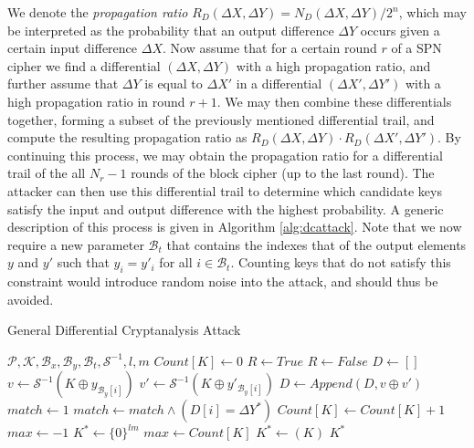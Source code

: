 We denote the \emph{propagation ratio} $R_D(\Delta X, \Delta Y) = N_D(\Delta X, \Delta Y) / 2^n$, which may be interpreted as the probability that an output difference $\Delta Y$ occurs given a certain input difference $\Delta X$. Now assume that for a certain round $r$ of a SPN cipher we find a differential $(\Delta X, \Delta Y)$ with a high propagation ratio, and further assume that $\Delta Y$ is equal to $\Delta X'$ in a differential $(\Delta X', \Delta Y')$ with a high propagation ratio in round $r + 1$. We may then combine these differentials together, forming a subset of the previously mentioned differential trail, and compute the resulting propagation ratio as $R_D(\Delta X, \Delta Y) \cdot R_D(\Delta X', \Delta Y')$. By continuing this process, we may obtain the propagation ratio for a differential trail of the all $N_r - 1$ rounds of the block cipher (up to the last round). The attacker can then use this differential trail to determine which candidate keys satisfy the input and output difference with the highest probability. A generic description of this process is given in Algorithm \ref{alg:dcattack}. Note that we now require a new parameter $\mathcal{B}_t$ that contains the indexes that of the output elements $y$ and $y'$ such that $y_i = y'_i$ for all $i \in \mathcal{B}_t$. Counting keys that do not satisfy this constraint would introduce random noise into the attack, and should thus be avoided.

\begin{algorithm}[t!] %
\caption{General Differential Cryptanalysis Attack} \label{alg:dcattack}
\begin{algorithmic}[1]
\Require $\mathcal{P}, \mathcal{K}, \mathcal{B}_x, \mathcal{B}_y, \mathcal{B}_t, \mathcal{S}^{-1}, l, m$
	\State $Count[K] \gets 0$
\EndFor
{}
	\State $R \gets True$
			\State $R \gets False$
		\EndIf
	\EndFor
			\State $D \gets []$
				\State $v \gets \mathcal{S}^{-1}(K \oplus y_{\mathcal{B}_{y}[i]})$
				\State $v' \gets \mathcal{S}^{-1}(K \oplus y'_{\mathcal{B}_{y}[i]})$
				\State $D \gets Append(D, v \oplus v')$
			\EndFor
			\State $match \gets 1$
				\State $match \gets match \land (D[i] = \Delta Y^*)$ 
			\EndFor
				\State $Count[K] \gets Count[K] + 1$
			\EndIf
		\EndFor
	\EndIf
\EndFor
\State $max \gets -1$
\State $K^* \gets \{0\}^{lm}$
		\State $max \gets Count[K]$
		\State $K^* \gets (K)$
	\EndIf
\EndFor
\State \Return $K^*$
\end{algorithmic}
\end{algorithm}

